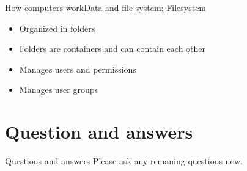 \documentclass[aspectratio=169]{beamer}
\begin{document}
\begin{frame}{How computers work}{Data and file-system: Filesystem}
\begin{itemize}
	\item Organized in folders
	\item Folders are containers and can contain each other
	\item Manages users and permissions
	\item Manages user groups
\end{itemize}
\end{frame}

\section{Question and answers}
\begin{frame}{Questions and answers}
\huge
\centering
Please ask any remaning questions now.
\end{frame}
\end{document}
